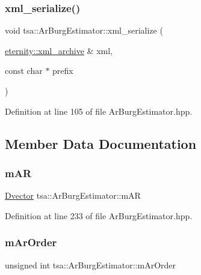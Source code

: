 \subsubsection{\texorpdfstring{xml\+\_\+serialize()}{xml\_serialize()}}
{\footnotesize\ttfamily void tsa\+::\+Ar\+Burg\+Estimator\+::xml\+\_\+serialize (\begin{DoxyParamCaption}\item[{\hyperlink{classeternity_1_1xml__archive}{eternity\+::xml\+\_\+archive} \&}]{xml,  }\item[{const char $\ast$}]{prefix }\end{DoxyParamCaption})\hspace{0.3cm}{\ttfamily [inline]}}



Definition at line 105 of file Ar\+Burg\+Estimator.\+hpp.



\subsection{Member Data Documentation}
\mbox{\label{classtsa_1_1_ar_burg_estimator_a6d0a5657630ecd64c33761a8f0c835e1}} 
\subsubsection{\texorpdfstring{m\+AR}{mAR}}
{\footnotesize\ttfamily \hyperlink{namespacetsa_a8900fb03d849baf447a1a0efe2561fb2}{Dvector} tsa\+::\+Ar\+Burg\+Estimator\+::m\+AR\hspace{0.3cm}{\ttfamily [private]}}



Definition at line 233 of file Ar\+Burg\+Estimator.\+hpp.

\mbox{\label{classtsa_1_1_ar_burg_estimator_a918baccfeb2101848018b6abcf1e9b19}} 
\subsubsection{\texorpdfstring{m\+Ar\+Order}{mArOrder}}
{\footnotesize\ttfamily unsigned int tsa\+::\+Ar\+Burg\+Estimator\+::m\+Ar\+Order\hspace{0.3cm}{\ttfamily [private]}}

